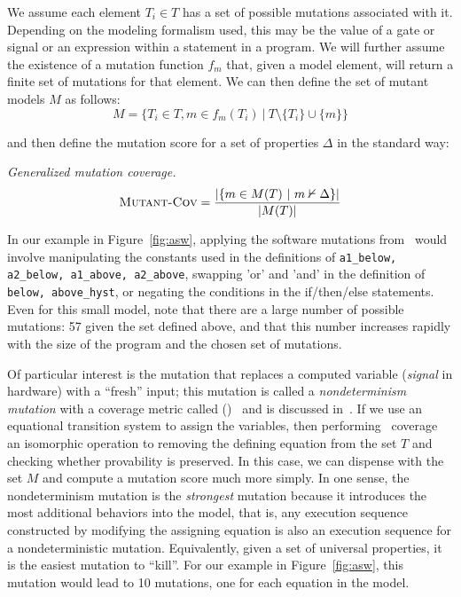 We assume each element $T_i \in T$ has a set of possible mutations associated with it.  Depending on the modeling formalism used, this may be the value of a gate or signal or an expression within a statement in a program.  We will further assume the existence of a mutation function $f_{m}$ that, given a model element, will return a finite set of mutations for that element.  We can then define the set of mutant models $M$ as follows:
\[
    M = \{ T_i \in T, m \in f_{m}(T_i)\ |\ T \setminus \{T_i\} \cup \{m\} \}
\]

\noindent and then define the mutation score for a set of properties $\Delta$ in the standard way:

\begin{definition} {\emph{Generalized mutation coverage.} } \\
\[
   \text{\sc Mutant-Cov} = \frac{ | \{m \in M(T)~|~ m \nvdash \Delta\} |}{|M(T)|}
\]
\end{definition}

In our example in Figure~\ref{fig:asw}, applying the software mutations from~\cite{Andrews06:mutation} would involve manipulating the constants used in the definitions of \texttt{a1\_below, a2\_below, a1\_above, a2\_above}, swapping 'or' and 'and' in the definition of \texttt{below, above\_hyst}, or negating the conditions in the if/then/else statements.  Even for this small model, note that there are a large number of possible mutations: 57 given the set defined above, and that this number increases rapidly with the size of the program and the chosen set of mutations.

Of particular interest is the mutation that replaces a computed variable ({\em signal} in hardware) with a ``fresh'' input; this mutation is called a {\em nondeterminism mutation} with a coverage metric called (\nondetcov)~\cite{chockler2010coverage} and is discussed in~\cite{Kupferman:2006:SCF,kupferman_theory_2008,chockler2010coverage}.  If we use an equational transition system to assign the variables, then performing \nondetcov\ coverage an isomorphic operation to removing the defining equation from the set $T$ and checking whether provability is preserved.  In this case, we can dispense with the set $M$ and compute a mutation score much more simply. In one sense, the nondeterminism mutation is the {\em strongest} mutation because it introduces the most additional behaviors into the model, that is, any execution sequence constructed by modifying the assigning equation is also an execution sequence for a nondeterministic mutation.  Equivalently, given a set of universal properties, it is the easiest mutation to ``kill''.  For our example in Figure~\ref{fig:asw}, this mutation would lead to 10 mutations, one for each equation in the model.

